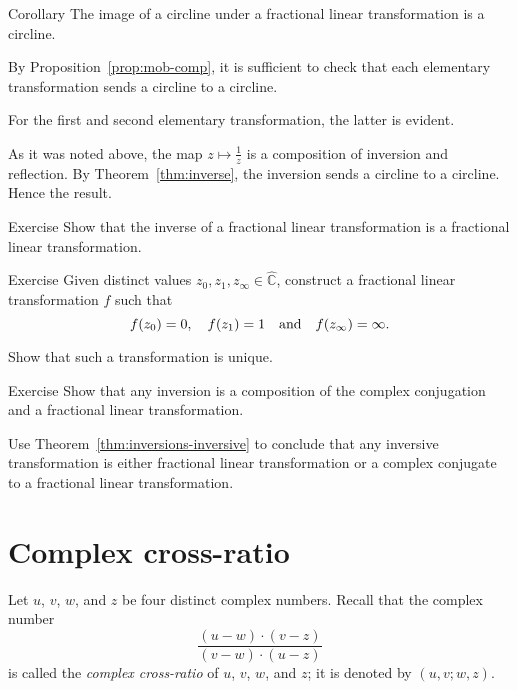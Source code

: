 \begin{thm}{Corollary}\label{cor:cline-Moeb}
The image of a circline under a fractional linear transformation 
is a circline.
\end{thm}

By Proposition~\ref{prop:mob-comp},
it is sufficient to check that each elementary transformation sends a circline to a circline.

For the first and second elementary transformation, the latter is evident.

As it was noted above,
the map $z\mapsto\tfrac1z$ is a composition of inversion and reflection.
By Theorem~\ref{thm:inverse}, the inversion sends a circline to a circline.
Hence the result.
\qeds

\begin{thm}{Exercise}\label{ex:inverse-Mob}
Show that the inverse of a fractional linear transformation is a fractional linear transformation.
\end{thm}


\begin{thm}{Exercise}\label{ex:3-point-Mob}
Given distinct values $z_0,z_1,z_\infty\in \hat{\mathbb{C}}$,
construct a fractional linear transformation $f$ such that 
\[f(z_0)=0,
\quad 
f(z_1)=1
\quad\text{and}\quad 
f(z_\infty)\z=\infty.\]

Show that such a transformation is unique.
\end{thm}

\begin{thm}{Exercise}\label{ex:inversion-Mob}
Show that any inversion is a composition of the complex conjugation and a fractional linear transformation.

Use Theorem~\ref{thm:inversions-inversive} to conclude that any inversive transformation is either fractional linear transformation or a complex conjugate to a fractional linear transformation.
\end{thm}



\section*{Complex cross-ratio}

Let $u$, $v$, $w$, and $z$ be four distinct complex numbers.
Recall that 
the complex number
$$
\frac{(u-w)\cdot(v-z)}{(v-w)\cdot(u-z)}$$
is called the \emph{complex cross-ratio} of $u$, $v$, $w$, and $z$; 
it is denoted by $(u,v;w,z)$.

